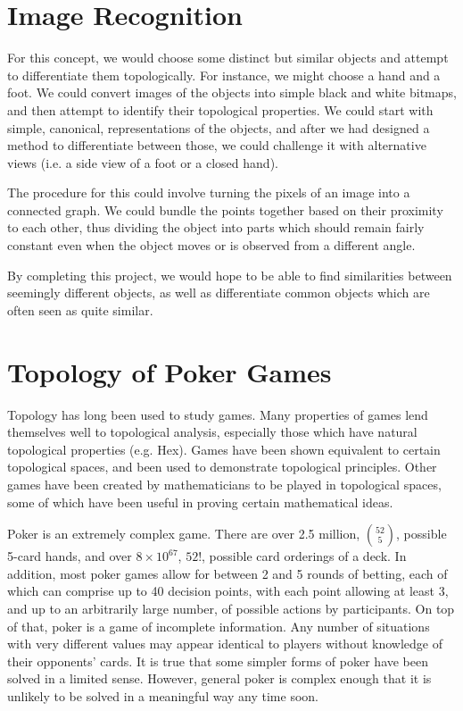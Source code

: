 \documentclass[11pt]{article}
\begin{document}
\section*{Image Recognition}
For this concept, we would choose some distinct but similar objects and attempt to
differentiate them topologically. For instance, we might choose a hand and a foot.
We could convert images of the objects into simple black and white bitmaps, and then attempt to
identify their topological properties. We could start with simple, canonical,
representations of the objects, and after we had designed a method to differentiate
between those, we could challenge it with alternative views (i.e. a side view of a
foot or a closed hand).

The procedure for this could involve turning the pixels of an image into a connected
graph. We could bundle the points together based on their proximity to each other,
thus dividing the object into parts which should remain fairly constant even when
the object moves or is observed from a different angle.

By completing this project, we would hope to be able to find similarities between
seemingly different objects, as well as differentiate common objects which are often
seen as quite similar.

\section*{Topology of Poker Games}
Topology has long been used to study games. Many properties of games
lend themselves well to topological analysis, especially those which have 
natural topological properties (e.g. Hex). Games have been shown equivalent to
certain topological spaces, and been used to demonstrate topological
principles\cite{Cao02}\cite{Gale79}. Other games have been created by mathematicians
to be played in topological spaces, some of which have been useful in proving
certain mathematical ideas\cite{TopoGame}\cite{BanachGame}\cite{Kenderov93}.

Poker is an extremely complex game. There are over 2.5 million, ${52 \choose 5}$,
possible 5-card hands, and over $8\times10^{67}$, $52!$, possible card orderings
of a deck. In addition, most poker games allow for between 2 and 5 rounds of betting,
each of which can comprise up to 40 decision points, with each point allowing
at least 3, and up to an arbitrarily large number, of possible actions by participants. On
top of that, poker is a game of incomplete information. Any number of situations
with very different values may appear identical to players without knowledge
of their opponents' cards. It is true that some simpler forms of poker have been
solved in a limited sense\cite{Bowling15}. However, general poker is complex
enough that it is unlikely to be solved in a meaningful way any time soon.
\end{document}
